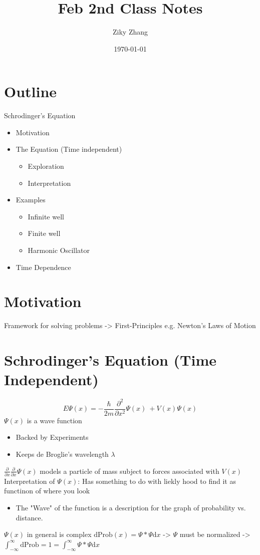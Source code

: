 \documentclass[11pt]{article}
\author{Ziky Zhang}
\date{\today}
\title{Feb 2nd Class Notes}
\begin{document}
\maketitle
\section{Outline}
\label{sec:org8cc34ef}
Schrodinger's Equation
\begin{itemize}
\item Motivation
\item The Equation (Time independent)
\begin{itemize}
\item Exploration
\item Interpretation
\end{itemize}
\item Examples
\begin{itemize}
\item Infinite well
\item Finite well
\item Harmonic Oscillator
\end{itemize}
\item Time Dependence
\end{itemize}
\section{Motivation}
\label{sec:org091cbfe}
Framework for solving problems
-> First-Principles
   e.g. Newton's Laws of Motion
\section{Schrodinger's Equation (Time Independent)}
\label{sec:orga19b706}
\[ E \Psi (x) = - \frac{\hbar}{2m} \frac{\partial^2}{\partial x^2} \Psi (x)\ + V(x) \Psi (x) \]
\(\Psi (x)\) is a wave function
\begin{itemize}
\item Backed by Experiments
\item Keeps de Broglie's wavelength \(\lambda\)
\end{itemize}

\(\frac{\partial }{\partial x} \frac{\partial }{\partial x} \Psi (x)\) models a particle of mass subject to forces associated with \(V(x)\)
Interpretation of \(\Psi(x)\): Has something to do with liekly hood to find it as functinon of where you look
\begin{itemize}
\item The "Wave" of the function is a description for the graph of probability vs. distance.
\end{itemize}
\(\Psi(x)\) in general is complex \(\mathrm{d Prob}(x) = \Psi * \Psi \mathrm{d}x\) -> \(\Psi\) must be normalized -> \(\int^{\infty}_{-\infty} \mathrm{d Prob} = 1 = \int^{\infty}_{- \infty} \Psi * \Psi \mathrm{d}x\)
\end{document}
